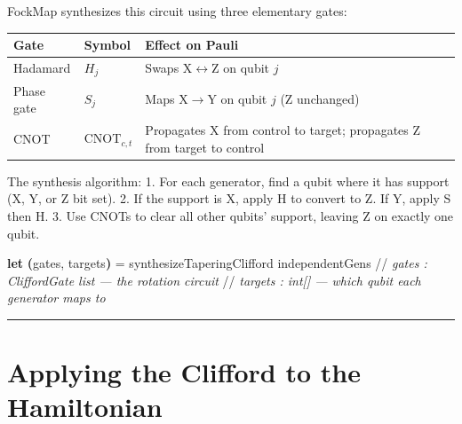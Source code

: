 \documentclass[
  11pt,
  oneside]{book}
\newenvironment{Shaded}{\begin{snugshade}}{\end{snugshade}}
\newcommand{\CommentTok}[1]{\textcolor[rgb]{0.56,0.35,0.01}{\textit{#1}}}
\newcommand{\KeywordTok}[1]{\textcolor[rgb]{0.13,0.29,0.53}{\textbf{#1}}}
\newcommand{\NormalTok}[1]{#1}
\newcommand{\OperatorTok}[1]{\textcolor[rgb]{0.81,0.36,0.00}{\textbf{#1}}}
\begin{document}
FockMap synthesizes this circuit using three elementary gates:

\begin{longtable}[]{@{}
  >{\raggedright\arraybackslash}p{}
  >{\centering\arraybackslash}p{}
  >{\raggedright\arraybackslash}p{}@{}}
\toprule\noalign{}
\begin{minipage}[b]{\linewidth}\raggedright
Gate
\end{minipage} & \begin{minipage}[b]{\linewidth}\centering
Symbol
\end{minipage} & \begin{minipage}[b]{\linewidth}\raggedright
Effect on Pauli
\end{minipage} \\
\midrule\noalign{}
\endhead
\bottomrule\noalign{}
\endlastfoot
Hadamard & \(H_j\) & Swaps X$\leftrightarrow$Z on qubit \(j\) \\
Phase gate & \(S_j\) & Maps X$\rightarrow$Y on qubit \(j\) (Z unchanged) \\
CNOT & \(\text{CNOT}_{c,t}\) & Propagates X from control to target;
propagates Z from target to control \\
\end{longtable}

The synthesis algorithm: 1. For each generator, find a qubit where it
has support (X, Y, or Z bit set). 2. If the support is X, apply H to
convert to Z. If Y, apply S then H. 3. Use CNOTs to clear all other
qubits' support, leaving Z on exactly one qubit.

\begin{Shaded}
\begin{Highlighting}[]
\KeywordTok{let} \OperatorTok{(}\NormalTok{gates, targets}\OperatorTok{)}\NormalTok{ = synthesizeTaperingClifford independentGens}
\NormalTok{//}\CommentTok{ gates : CliffordGate list --- the rotation circuit}
\NormalTok{//}\CommentTok{ targets : int[] --- which qubit each generator maps to}
\end{Highlighting}
\end{Shaded}

\begin{center}\rule{0.5\linewidth}{0.5pt}\end{center}

\section{Applying the Clifford to the
Hamiltonian}\label{applying-the-clifford-to-the-hamiltonian}
\end{document}
